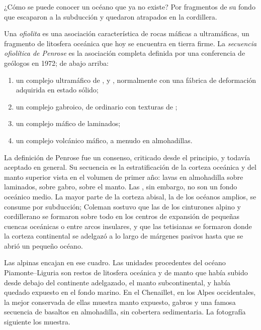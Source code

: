 ¿Cómo se puede conocer un océano que ya no existe? Por fragmentos de su fondo que escaparon a la
subducción y quedaron atrapados en la cordillera.

\begin{definition}\label{def:b2:alpine-orogen:ophiolite}
Una \emph{ofiolita} es una asociación característica de rocas máficas a
ultramáficas, un fragmento de litosfera oceánica que hoy se encuentra en tierra firme. La \emph{secuencia ofiolítica
de Penrose} es la asociación completa definida por una
conferencia de geólogos en 1972; de abajo arriba:
\begin{enumerate}
\item un complejo ultramáfico de ,  y , normalmente con una
fábrica de deformación adquirida en estado sólido;
\item un complejo gabroico, de ordinario con texturas de ;
\item un complejo máfico de  laminados;
\item un complejo volcánico máfico, a menudo en almohadillas.
\end{enumerate}
\end{definition}

La definición de Penrose fue un consenso, criticado desde el principio, y todavía aceptado en general.
Su secuencia es la estratificación de la corteza oceánica y del manto superior vista en el volumen de primer
año: lavas en almohadilla sobre  laminados, sobre gabro, sobre el manto. Las , sin embargo, no son
un fondo oceánico medio. La mayor parte de la corteza abisal, la de los océanos amplios, se consume por
subducción; Coleman sostuvo que las  de los cinturones alpino y cordillerano se formaron
sobre todo en los centros de expansión de pequeñas cuencas oceánicas o entre arcos insulares, y que las
tetisianas se formaron donde la corteza continental se adelgazó a lo largo de márgenes pasivos hasta que se abrió un pequeño
océano.

Las  alpinas encajan en ese cuadro. Las unidades procedentes del océano Piamonte--Liguria
son restos de litosfera oceánica y de manto que había subido desde debajo del
continente adelgazado, el manto subcontinental, y había quedado expuesto en el fondo marino. En el
Chenaillet, en los Alpes occidentales, la mejor conservada de ellas muestra manto
expuesto, gabros y una famosa secuencia de basaltos en almohadilla, sin cobertera sedimentaria.
La fotografía siguiente los muestra.


